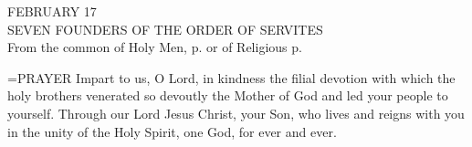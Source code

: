 \begin{center}\normalsize FEBRUARY 17\\
\footnotesize SEVEN FOUNDERS OF THE ORDER OF SERVITES\\
\footnotesize From the common of Holy Men, p.   or of Religious p. \\
\end{center}

\hangindent=\parindent \small{PRAYER 
Impart to us, O Lord, in kindness
the filial devotion with which the holy brothers
venerated so devoutly the Mother of God
and led your people to yourself.
Through our Lord Jesus Christ, your Son,
who lives and reigns with you in the unity of the Holy Spirit,
one God, for ever and ever.\\}
 
